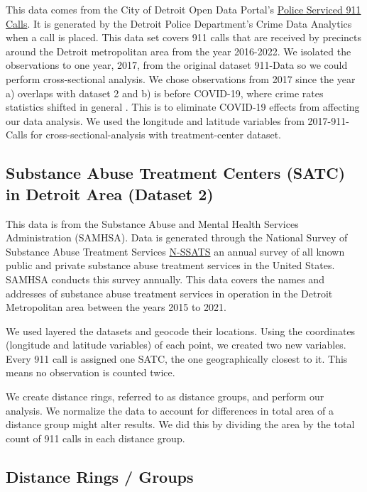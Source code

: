 \documentclass[12pt]{article}
\begin{document}
This data comes from the City of Detroit Open Data Portal's   \href{https://data.detroitmi.gov/datasets/detroitmi::police-serviced-911-calls/about}{Police Serviced 911 Calls}. It is generated by the Detroit Police Department's Crime Data Analytics when a call is placed. This data set covers 911 calls that are received by precincts around the Detroit metropolitan area from the year 2016-2022. We isolated the observations to one year, 2017, from the original dataset 911-Data so we could perform cross-sectional analysis. We chose observations from 2017 since the year a) overlaps with dataset 2 and b) is before COVID-19, where crime rates statistics shifted in general \cite{covid_and_crime}. This is to eliminate COVID-19 effects from affecting our data analysis. We used the longitude and latitude variables from 2017-911-Calls for cross-sectional-analysis with treatment-center dataset.

\subsection{Substance Abuse Treatment Centers (SATC) in Detroit Area (Dataset 2)}

This data is from the Substance Abuse and Mental Health Services Administration (SAMHSA). Data is generated through the National Survey of Substance Abuse Treatment Services \href{https://www.samhsa.gov/data/data-we-collect/n-ssats-national-survey-substance-abuse-treatment-services}{N-SSATS} an annual survey of all known public and private substance abuse treatment services in the United States. SAMHSA conducts this survey annually. This data covers the names and addresses of substance abuse treatment services in operation in the Detroit Metropolitan area between the years 2015 to 2021. 


We used layered the datasets and geocode their locations. Using the coordinates (longitude and latitude variables) of each point, we created two new variables. Every 911 call is assigned one SATC, the one geographically closest to it. This means no observation is counted twice. 

We create distance rings, referred to as distance groups, and perform our analysis. We normalize the data to account for differences in total area of a distance group might alter results. We did this by dividing the area by the total count of 911 calls in each distance group. 

\subsection{Distance Rings / Groups}
\end{document}

